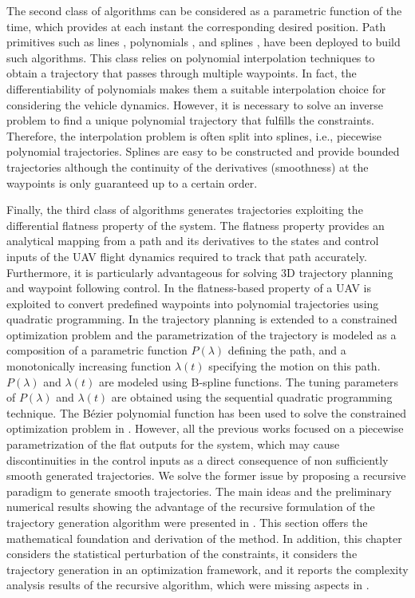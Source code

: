 The second class of algorithms can be considered as a parametric function of the time, which provides at each instant the corresponding desired position. Path primitives such as lines \cite{HoffmannQuadrotor}, polynomials \cite{7068316}, and splines \cite{4602025}, have been deployed to build such algorithms. This class relies on polynomial interpolation techniques to obtain a trajectory that passes through multiple waypoints. In fact, the differentiability of polynomials makes them a suitable interpolation choice for considering the vehicle dynamics. However, it is necessary to solve an inverse problem to find a unique polynomial trajectory that fulfills the constraints. Therefore, the interpolation problem is often split into splines, i.e., piecewise polynomial trajectories. Splines are easy to be constructed and provide bounded trajectories although the continuity of the derivatives (smoothness) at the waypoints is only guaranteed up to a certain order.

Finally, the third class of algorithms generates trajectories exploiting the differential flatness property of the system. The flatness property provides an analytical mapping from a path and its derivatives to the states and control inputs of the UAV flight dynamics required to track that path accurately. Furthermore, it is particularly advantageous for solving 3D trajectory planning and waypoint following control. In \cite{richter2016polynomial} the flatness-based property of a UAV is exploited to convert predefined waypoints into polynomial trajectories using quadratic programming. In \cite{4602025} the trajectory planning is extended to a constrained optimization problem and the parametrization of the trajectory is modeled as a composition of a parametric function $P(\lambda)$ defining the path, and a monotonically increasing function $\lambda(t)$ specifying the motion on this path. $P(\lambda)$ and $\lambda(t)$ are modeled using B-spline functions. The tuning parameters of $P(\lambda)$ and $\lambda(t)$ are obtained using the sequential quadratic programming technique. The B\'ezier polynomial function has been used to solve the constrained optimization problem in  \cite{6324664}. However, all the previous works focused on a piecewise parametrization of the flat outputs for the system, which may cause discontinuities in the control inputs as a direct consequence of non sufficiently smooth generated trajectories. 
We solve the former issue by proposing a recursive paradigm to generate smooth trajectories. The main ideas and the preliminary numerical results showing the advantage of the recursive formulation of the trajectory generation algorithm were presented in \cite{Letizia2020_rst}. This section offers the mathematical foundation and derivation of the method. In addition, this chapter considers the statistical perturbation of the constraints, it considers the trajectory generation in an optimization framework, and it reports the complexity analysis results of the recursive algorithm, which were missing aspects in \cite{Letizia2020_rst}.

